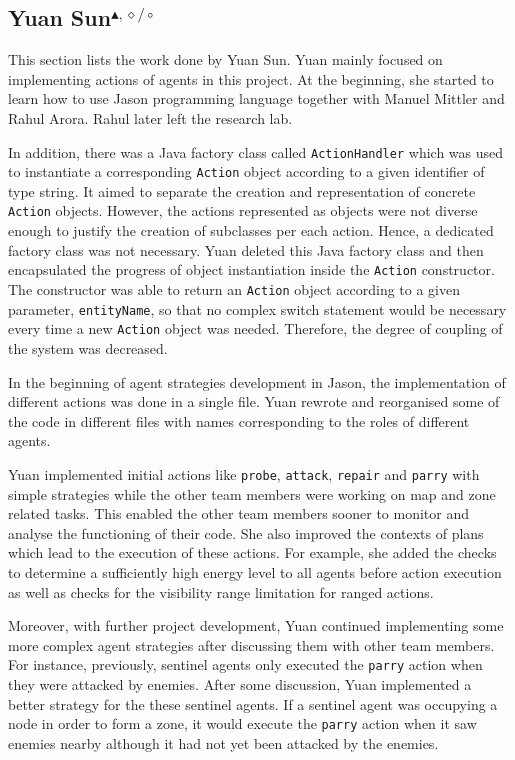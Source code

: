 \subsection[Yuan Sun]{Yuan Sun$^{\blacktriangle,\diamond/\circ}$}\label{org:sun}
This section lists the work done by Yuan Sun.
Yuan mainly focused on implementing actions of agents in this project.
At the beginning, she started to learn how to use Jason programming language together with Manuel Mittler and Rahul Arora.
Rahul later left the research lab. %

In addition, there was a Java factory class called \texttt{ActionHandler} which was used to instantiate a corresponding \texttt{Action} object according to a given identifier of type string.
It aimed to separate the creation and representation of concrete \texttt{Action} objects.
However, the actions represented as objects were not diverse enough to justify the creation of subclasses per each action.
Hence, a dedicated factory class was not necessary.
Yuan deleted this Java factory class and then encapsulated the progress of object instantiation inside the \texttt{Action} constructor.
The constructor was able to return an \texttt{Action} object according to a given parameter, \texttt{entityName}, so that no complex switch statement would be necessary every time a new \texttt{Action} object was needed.
Therefore, the degree of coupling of the system was decreased.

In the beginning of agent strategies development in Jason, the implementation of different actions was done in a single file.
Yuan rewrote and reorganised some of the code in different files with names corresponding to the roles of different agents.

Yuan implemented initial actions like \texttt{probe}, \texttt{attack}, \texttt{repair} and \texttt{parry} with simple strategies while the other team members were working on map and zone related tasks.
This enabled the other team members sooner to monitor and analyse the functioning of their code.
She also improved the contexts of plans which lead to the execution of these actions.
For example, she added the checks to determine a sufficiently high energy level to all agents before action execution as well as checks for the visibility range limitation for ranged actions.

Moreover, with further project development, Yuan continued implementing some more complex agent strategies after discussing them with other team members.
For instance, previously, sentinel agents only executed the \texttt{parry} action when they were attacked by enemies.
After some discussion, Yuan implemented a better strategy for the these sentinel agents.
If a sentinel agent was occupying a node in order to form a zone, it would execute the \texttt{parry} action when it saw enemies nearby although it had not yet been attacked by the enemies.

